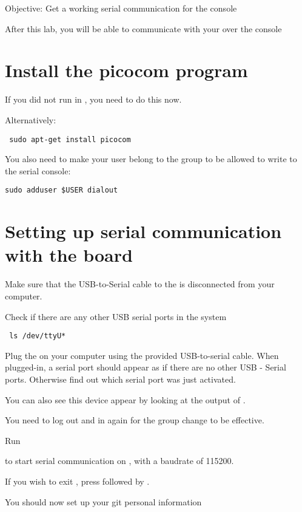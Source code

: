 {Objective: Get a working serial communication for the console}

After this lab, you will be able to communicate with your \devboard over the console

\section{Install the picocom program}

If you did not run  in \labdir, you need to do this now.

Alternatively:

{\small
{\tt
sudo apt-get install picocom
}
}

You also need to make your user belong to the  group to be
allowed to write to the serial console:

\begin{verbatim}
sudo adduser $USER dialout
\end{verbatim}

\section{Setting up serial communication with the board}

Make sure that the USB-to-Serial cable to the \devboard is disconnected from your computer.

Check if there are any other USB serial ports in the system

{\small
{\tt
ls /dev/ttyU*
}
}

Plug the \devboard on your computer using the provided
USB-to-serial cable. When plugged-in, a serial port should appear as
 if there are no other USB - Serial ports.
Otherwise find out which serial port was just activated.

You can also see this device appear by looking at the output of
.


You need to log out and in again for the group change to be effective.

Run 


to start serial communication on , with a baudrate of 115200.

If you wish to exit , press \code{[Ctrl][a]} followed by
\code{[Ctrl][x]}.

You should now set up your git personal information
